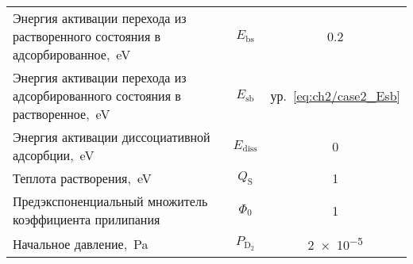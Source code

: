 \begin{table}[h]
\begin{threeparttable}
\begin{tabularx}{\textwidth}{@{}>{\raggedright}Xcc}
            Энергия активации перехода из растворенного состояния в адсорбированное,~\si{\electronvolt} & $E_\mathrm{bs}$                        & \num{0.2}                    \\
            Энергия активации перехода из адсорбированного состояния в растворенное,~\si{\electronvolt} & $E_\mathrm{sb}$                        & ур.~\cref{eq:ch2/case2_Esb}  \\
            Энергия активации диссоциативной адсорбции,~\si{\electronvolt}                              & $E_\mathrm{diss} $                     & 0                            \\
            Теплота растворения,~\si{\electronvolt}                                                     & $Q_\mathrm{S}$                         & 1                            \\
            Предэкспоненциальный множитель коэффициента прилипания                                      & $\Phi_0$                               & 1                            \\
            Начальное давление,~\si{\pascal}                                                            & $P_\mathrm{D_2}$                       & \num{2e-5}                   \\
            \bottomrule
        \end{tabularx}
    \end{threeparttable}
\end{table}

